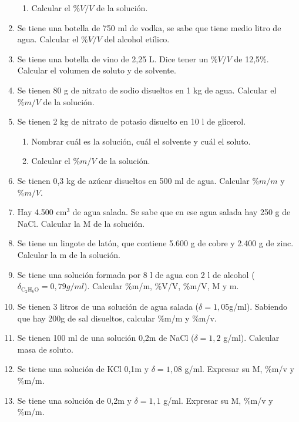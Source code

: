\begin{enumerate}
\begin{enumerate}
    \item Calcular el $\%V/V$ de la solución.
\end{enumerate}

\item Se tiene una botella de 750 ml de vodka, se sabe que tiene medio litro de agua. Calcular el $\%V/V$ del alcohol etílico.

\item Se tiene una botella de vino de 2,25 L. Dice tener un $\%V/V$ de 12,5\%. Calcular el volumen de soluto y de solvente.

\item Se tienen 80 g de nitrato de sodio disueltos en 1 kg de agua. Calcular el $\%m/V$ de la solución.

\item Se tienen 2 kg de nitrato de potasio disuelto en 10 l de glicerol. 
\begin{enumerate}
    \item Nombrar cuál es la solución, cuál el solvente y cuál el soluto.

    \item Calcular el $\%m/V$ de la solución.
\end{enumerate}

\item Se tienen 0,3 kg de azúcar disueltos en 500 ml de agua. Calcular $\%m/m$ y $\%m/V$.

\item Hay 4.500 cm$^3$ de agua salada. Se sabe que en ese agua salada hay 250 g de NaCl. Calcular la M de la solución. %

\item Se tiene un lingote de latón, que contiene 5.600 g de cobre y 2.400 g de zinc. Calcular la m de la solución. %

\item Se tiene una solución formada por 8 l de agua con 2 l de alcohol ($\delta_{\text{C}_2\text{H}_6\text{O}}=0,79 g/ml$). Calcular \%m/m, \linebreak
\%V/V, \%m/V, M y m.

\item Se tienen 3 litros de una solución de agua salada ($\delta = 1,05$g/ml). Sabiendo que hay 200g de sal disueltos, calcular \%m/m y \%m/v. %

\item Se tienen 100 ml de una solución 0,2m de NaCl ($\delta = 1,2$ g/ml). Calcular masa de soluto. %

\item Se tiene una solución de KCl 0,1m y $\delta=1,08$ g/ml. Expresar su M, \%m/v y \%m/m.

\item Se tiene una solución de  0,2m y $\delta=1,1$ g/ml. Expresar su M, \%m/v y \%m/m.
\end{enumerate}

